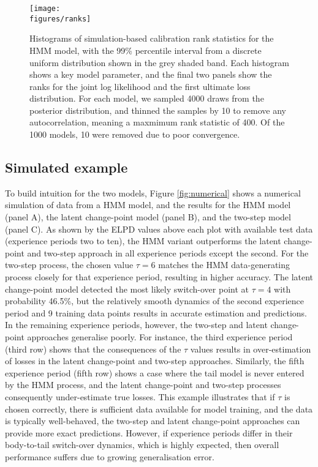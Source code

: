 \begin{figure}
    \centering
    \texttt{[image: \\figures/ranks]}
    \caption{
		Histograms of simulation-based calibration
		rank statistics for the HMM model, 
        with the 99\% percentile
        interval from a discrete uniform distribution
        shown in the grey shaded band.
        Each histogram shows a key model parameter,
        and the final two panels show the ranks
        for the joint log
        likelihood and the first ultimate loss
        distribution.
        For each model, we sampled
        4000 draws from the posterior distribution,
        and thinned the samples by 10 to remove any
        autocorrelation, meaning a maxmimum rank statistic
        of 400. Of the 1000 models,
        10 were removed due to poor convergence.
    }
	\label{fig:sbc}
\end{figure}

\subsection{Simulated example}
To build intuition for the two models,
Figure \ref{fig:numerical} shows a numerical
simulation of data from a HMM model,
and the results for the HMM model
(panel A), the latent change-point
model (panel B), and the
two-step model (panel C).
As shown by the ELPD values above each
plot with available test data (experience
periods two to ten), 
the HMM variant outperforms
the latent change-point and two-step approach
in all
experience periods except the second.
For the two-step process, the chosen value $\tau = 6$
matches the HMM data-generating process
closely for that experience period, 
resulting in higher accuracy. 
The latent change-point model detected the most
likely switch-over point at $\tau = 4$ with probability
46.5\%, but the relatively smooth dynamics of the
second experience period and 9 training data points
results in accurate estimation and predictions. 
In the remaining experience
periods, however, the two-step and latent change-point approaches
generalise poorly.
For instance, the third experience period (third row)
shows that the consequences of the $\tau$ values results
in over-estimation of losses in the latent change-point
and two-step approaches.
Similarly, the fifth experience period (fifth row)
shows a case where the tail model is never
entered by the HMM process, and the
latent change-point and two-step processes
consequently under-estimate true losses.
This example illustrates that
if $\tau$ is chosen correctly, there is sufficient
data available for model training,
and the data is typically well-behaved,
the two-step and latent change-point approaches 
can provide more exact predictions.
However, if experience periods differ in their
body-to-tail switch-over dynamics,
which is highly expected, then overall
performance suffers due to
growing generalisation error.

